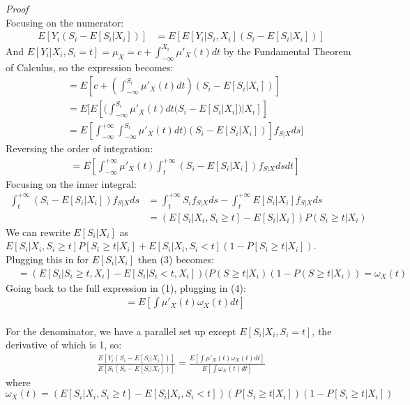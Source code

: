 \documentclass[11pt]{article}
\begin{document}
\textit{Proof} \\
Focusing on the numerator:
	\begin{align*}
		E[Y_i(S_i - E[S_i|X_i])] &= E[E[Y_i|S_i, X_i] (S_i - E[S_i|X_i])]
	\end{align*}
And $E[Y_i|X_i, S_i=t]=\mu_{X} = c + \int^{X_i}_{-\infty} \mu'_X(t) dt$  by the Fundamental Theorem of Calculus, so the expression becomes: 
	\begin{align*}
		&= E[c+ (\int^{S_i}_{-\infty} \mu'_X(t) dt)  (S_i - E[S_i|X_i])] \\
		&= E[ E[(\int^{S_i}_{-\infty} \mu'_X(t) dt (S_i - E[S_i|X_i]) | X_i] ]\\
		&=E[ \int^{+\infty}_{-\infty}\int^{S_i}_{-\infty} \mu'_X(t) dt)  (S_i - E[S_i|X_i])]f_{S|X}ds ]
	\end{align*}
Reversing the order of integration: 
	\begin{align}
		&=E[ \int^{+\infty}_{-\infty} \mu'_X(t) \int^{+ \infty}_{t} ( S_i - E[S_i|X_i]) f_{S|X} ds dt ]
	\end{align}
Focusing on the inner integral:
	\begin{align}
		\int^{+ \infty}_{t} ( S_i - E[S_i|X_i]) f_{S|X} ds &= \int^{+ \infty}_{t} S_i f_{S|X} ds - \int^{+ \infty}_{t} E[S_i|X_i] f_{S|X} ds \\
		&=(E[S_i |  X_i, S_i \geq t] - E[S_i | X_i] ) P(S_i \geq t | X_i) 
	\end{align}		
We can rewrite $E[S_i|X_i]$ as $E[S_i|X_i, S_i \geq t]P[S_i\geq t|X_i] + E[S_i|X_i, S_i < t](1 - P[S_i\geq t|X_i])$. Plugging this in for $E[S_i | X_i]$ then (3) becomes:
	\begin{align}
		&=(E[S_i | S_i \geq t, X_i ] - E[S_i | S_i < t, X_i ] )(P(S \geq t | X_i)( 1 - P(S \geq t | X_i)) = \omega_X(t)
	\end{align}
Going back to the full expression in (1), plugging in (4):
	\begin{align*}
		 &=E [\int \mu'_X(t) \omega_X(t) dt]
	\end{align*}
\\
For the denominator, we have a parallel set up except $E[S_i| X_i, S_i=t]$, the derivative of which is 1, so: 
	\begin{align*}
		\frac{E[Y_i(S_i - E[S_i|X_i])]}{E[S_i(S_i - E[S_i|X_i])]} = \frac{E [\int \mu'_X(t) 		\omega_X(t) dt]}{E[\int \omega_X(t) dt]}
	\end{align*}
	where $\omega_X(t) = ( E[S_i | X_i, S_i \geq t ] -E[S_i | X_i, S_i < t])(P[S_i\geq t| X_i])(1 -  P[S_i\geq t| X_i])$ 
\end{document}
